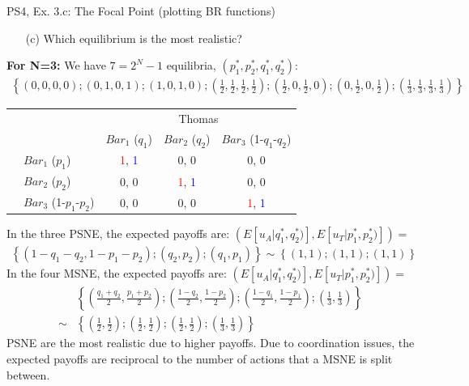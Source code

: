 \begin{frame}{PS4, Ex. 3.c: The Focal Point (plotting BR functions)}
    \begin{itemize}
      \item[(c)] Which equilibrium is the most realistic?
    \end{itemize}
    \textbf{For N=3:} We have $7=2^N-1$ equilibria, $(p_1^{*},p_2^{*},q_1^{*},q_2^{*})$:
    \begin{align*}
      \left\{(0,0,0,0);(0,1,0,1);(1,0,1,0)
      ;\left(\frac{1}{2},\frac{1}{2},\frac{1}{2},\frac{1}{2}\right)
      ;\left(\frac{1}{2},0,\frac{1}{2},0\right)
      ;\left(0,\frac{1}{2},0,\frac{1}{2}\right)
      ;\left(\frac{1}{3},\frac{1}{3},\frac{1}{3},\frac{1}{3}\right)
      \right\}
    \end{align*}
    \vspace{-12pt}
    \begin{table}
      \begin{tabular}{cl|c|c|c|}
        & \multicolumn{1}{c}{} & \multicolumn{3}{c}{\color{blue}Thomas}\\
        & \multicolumn{1}{c}{} & \multicolumn{1}{c}{$Bar_1$ ($q_1$)} & \multicolumn{1}{c}{$Bar_2$ ($q_2$)} & \multicolumn{1}{c}{$Bar_3$ (1-$q_1$-$q_2$)} \\\cline{3-5}
        \parbox[t]{1mm}{}
        & $Bar_1$ ($p_1$) & \textcolor{red}{1}, \textcolor{blue}{1} & 0, 0 & 0, 0 \\
        & $Bar_2$ ($p_2$) & 0, 0 & \textcolor{red}{1}, \textcolor{blue}{1} & 0, 0 \\
        & $Bar_3$ (1-$p_1$-$p_2$) & 0, 0 & 0, 0 & \textcolor{red}{1}, \textcolor{blue}{1} \\
      \end{tabular}
    \end{table}
    In the three PSNE, the expected payoffs are: $\left(E[u_A|q_1^{*},q_2^{*})],E[u_T|p_1^{*},p_2^{*})]\right)=$
    \begin{align*}
      \left\{(1-q_1-q_2,1-p_1-p_2);(q_2,p_2);(q_1,p_1)\right\}\sim
      \left\{(1,1);(1,1);(1,1)\right\}
    \end{align*}
    In the four MSNE, the expected payoffs are: $\left(E[u_A|q_1^{*},q_2^{*})],E[u_T|p_1^{*},p_2^{*})]\right)=$
    \begin{align*}
     &\left\{\left(\frac{q_1+q_2}{2},\frac{p_1+p_2}{2}\right)
      ;\left(\frac{1-q_2}{2},\frac{1-p_2}{2}\right)
      ;\left(\frac{1-q_1}{2},\frac{1-p_1}{2}\right)
      ;\left(\frac{1}{3},\frac{1}{3}\right)\right\} \\
     \sim
     &\left\{\left(\frac{1}{2},\frac{1}{2}\right)
      ;\left(\frac{1}{2},\frac{1}{2}\right)
      ;\left(\frac{1}{2},\frac{1}{2}\right)
      ;\left(\frac{1}{3},\frac{1}{3}\right)\right\}
    \end{align*}
    PSNE are the most realistic due to higher payoffs. Due to coordination issues, the expected payoffs are reciprocal to the number of actions that a MSNE is split between.
\end{frame}


